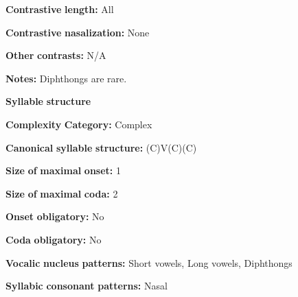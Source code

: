 \begin{styleBody}
\textbf{Contrastive} \textbf{length:} All
\end{styleBody}

\begin{styleBody}
\textbf{Contrastive} \textbf{nasalization:} None
\end{styleBody}

\begin{styleBody}
\textbf{Other} \textbf{contrasts:} N/A
\end{styleBody}

\begin{styleBody}
\textbf{Notes:} Diphthongs are rare.
\end{styleBody}

\begin{styleBody}
\textbf{Syllable} \textbf{structure}
\end{styleBody}

\begin{styleBody}
\textbf{Complexity} \textbf{Category:} Complex
\end{styleBody}

\begin{styleBody}
\textbf{Canonical} \textbf{syllable} \textbf{structure:} (C)V(C)(C) \citep[6-9]{Sapir1965}
\end{styleBody}

\begin{styleBody}
\textbf{Size} \textbf{of} \textbf{maximal} \textbf{onset:} 1
\end{styleBody}

\begin{styleBody}
\textbf{Size} \textbf{of} \textbf{maximal} \textbf{coda:} 2
\end{styleBody}

\begin{styleBody}
\textbf{Onset} \textbf{obligatory:} No
\end{styleBody}

\begin{styleBody}
\textbf{Coda} \textbf{obligatory:} No
\end{styleBody}

\begin{styleBody}
\textbf{Vocalic} \textbf{nucleus} \textbf{patterns:} Short vowels, Long vowels, Diphthongs
\end{styleBody}

\begin{styleBody}
\textbf{Syllabic} \textbf{consonant} \textbf{patterns:} Nasal
\end{styleBody}


